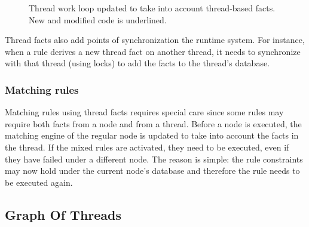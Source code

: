 \begin{figure}
\begin{algorithm}[H]
\end{algorithm}
\caption{Thread work loop updated to take into account thread-based facts.
New and modified code is underlined.}
\label{alg:threads:work_loop}
\end{figure}

Thread facts also add points of synchronization the runtime system. For
instance, when a rule derives a new thread fact on another thread, it needs to
synchronize with that thread (using locks) to add the facts to the thread's
database.

\subsubsection{Matching rules}

Matching rules using thread facts requires special care since some rules may
require both facts from a node and from a thread. Before a node is executed, the
matching engine of the regular node is updated to take into account the facts in
the thread. If the mixed rules are activated, they need to be executed, even if
they have failed under a different node. The reason is simple: the rule
constraints may now hold under the current node's database and therefore the
rule needs to be executed again.

\subsection{Graph Of Threads}

